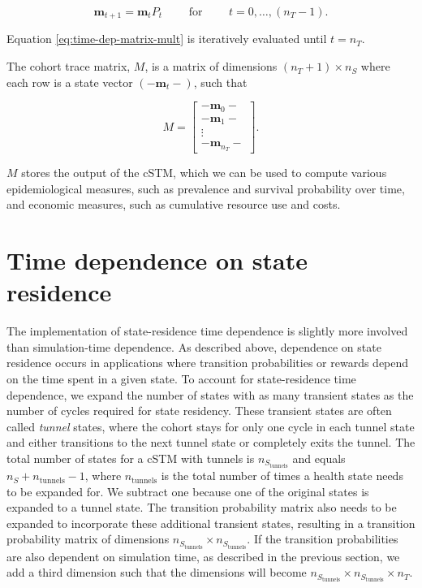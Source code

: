 \documentclass[
]{article}
\begin{document}
\begin{equation}
  \label{eq:time-dep-matrix-mult}
  \mathbf{m}_{t+1} = \mathbf{m}_{t} P_t \qquad\text{ for }\qquad t = 0,\ldots, (n_T - 1).
\end{equation}

Equation \eqref{eq:time-dep-matrix-mult} is iteratively evaluated until \(t = n_T\).

The cohort trace matrix, \(M\), is a matrix of dimensions \((n_T+1) \times n_S\) where each row is a state vector \((-\mathbf{m}_{t}-)\), such that

\[
  M = 
  \begin{bmatrix}
    - \mathbf{m}_0 -  \\
    - \mathbf{m}_1 -  \\
     \vdots \\
    - \mathbf{m}_{n_T} -  
  \end{bmatrix}. 
\]

\(M\) stores the output of the cSTM, which we can be used to compute various epidemiological measures, such as prevalence and survival probability over time, and economic measures, such as cumulative resource use and costs.

\hypertarget{time-dependence-on-state-residence}{%
\section{Time dependence on state residence}\label{time-dependence-on-state-residence}}

The implementation of state-residence time dependence is slightly more involved than simulation-time dependence. As described above, dependence on state residence occurs in applications where transition probabilities or rewards depend on the time spent in a given state. To account for state-residence time dependence, we expand the number of states with as many transient states as the number of cycles required for state residency. These transient states are often called \emph{tunnel} states, where the cohort stays for only one cycle in each tunnel state and either transitions to the next tunnel state or completely exits the tunnel. The total number of states for a cSTM with tunnels is \(n_{S_\text{tunnels}}\) and equals \(n_S + n_{\text{tunnels}} - 1\), where \(n_{\text{tunnels}}\) is the total number of times a health state needs to be expanded for. We subtract one because one of the original states is expanded to a tunnel state. The transition probability matrix also needs to be expanded to incorporate these additional transient states, resulting in a transition probability matrix of dimensions \(n_{S_\text{tunnels}} \times n_{S_\text{tunnels}}\). If the transition probabilities are also dependent on simulation time, as described in the previous section, we add a third dimension such that the dimensions will become \(n_{S_\text{tunnels}} \times n_{S_\text{tunnels}} \times n_T\).
\end{document}
